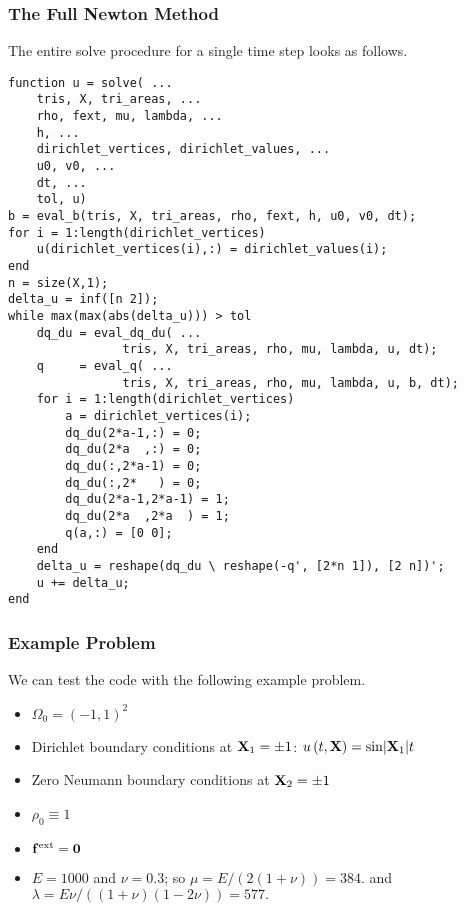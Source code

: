 \vspace{.5\baselineskip}
\subsubsection{The Full Newton Method}

The entire solve procedure for a single time step looks as follows.
\begin{verbatim}
function u = solve( ...
    tris, X, tri_areas, ...
    rho, fext, mu, lambda, ...
    h, ...
    dirichlet_vertices, dirichlet_values, ...
    u0, v0, ...
    dt, ...
    tol, u)
b = eval_b(tris, X, tri_areas, rho, fext, h, u0, v0, dt);
for i = 1:length(dirichlet_vertices)
    u(dirichlet_vertices(i),:) = dirichlet_values(i);
end
n = size(X,1);
delta_u = inf([n 2]);
while max(max(abs(delta_u))) > tol
    dq_du = eval_dq_du( ...
                tris, X, tri_areas, rho, mu, lambda, u, dt);
    q     = eval_q( ...
                tris, X, tri_areas, rho, mu, lambda, u, b, dt);
    for i = 1:length(dirichlet_vertices)
        a = dirichlet_vertices(i);
        dq_du(2*a-1,:) = 0;
        dq_du(2*a  ,:) = 0;
        dq_du(:,2*a-1) = 0;
        dq_du(:,2*   ) = 0;
        dq_du(2*a-1,2*a-1) = 1;
        dq_du(2*a  ,2*a  ) = 1;
        q(a,:) = [0 0];
    end
    delta_u = reshape(dq_du \ reshape(-q', [2*n 1]), [2 n])';
    u += delta_u;
end
\end{verbatim}

\subsubsection{Example Problem}

We can test the code with the following example problem.
\begin{itemize}
\item $\Omega_0 = (-1,1)^2$
\item Dirichlet boundary conditions at $\mathbf{X}_1 = \pm 1$: $u \left( t, \mathbf{X} \right) = \sin \lvert \mathbf{X}_1 \rvert t$
\item Zero Neumann boundary conditions at $\mathbf{X}_2 = \pm 1$
\item $\rho_0 \equiv 1$
\item $\mathbf{f}^{\text{ext}} = \mathbf{0}$
\item $E = 1000$ and $\nu = 0.3$; so $\mu = E / (2 (1 + \nu)) = 384.$ and $\lambda = E \nu / ((1 + \nu) (1 - 2\nu)) = 577.$
\end{itemize}
